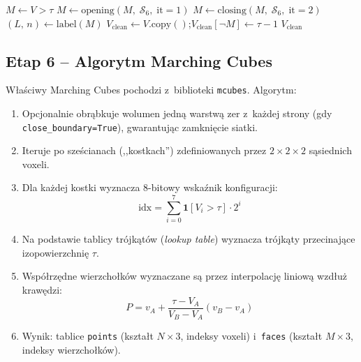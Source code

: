 \documentclass[12pt,a4paper]{article}
\begin{document}
\begin{algorithm}[H]
\caption{\textsc{Segment} -- segmentacja morfologiczna i filtracja składowych}
\label{alg:seg}
\BlankLine
$M \leftarrow V > \tau$\;
$M \leftarrow \mathrm{opening}(M,\;\mathcal{S}_6,\;\text{it}=1)$\;
$M \leftarrow \mathrm{closing}(M,\;\mathcal{S}_6,\;\text{it}=2)$\;
$(L,\,n) \leftarrow \mathrm{label}(M)$
$V_{\text{clean}} \leftarrow V.\mathrm{copy}()$;\quad $V_{\text{clean}}[\lnot M] \leftarrow \tau - 1$\;
\Return $V_{\text{clean}}$\;
\end{algorithm}

\subsection{Etap 6 -- Algorytm Marching Cubes}
\label{sec:mc}

Właściwy Marching Cubes pochodzi z~biblioteki \texttt{mcubes}. Algorytm:
\begin{enumerate}
  \item Opcjonalnie obrąbkuje wolumen jedną warstwą zer z~każdej strony
    (gdy \texttt{close\_boundary=True}), gwarantując zamknięcie siatki.
  \item Iteruje po sześcianach (,,kostkach'') zdefiniowanych przez $2 \times 2 \times 2$
    sąsiednich voxeli.
  \item Dla każdej kostki wyznacza 8-bitowy wskaźnik konfiguracji:
    \[
      \text{idx} = \sum_{i=0}^{7} \mathbf{1}[V_i > \tau] \cdot 2^i
    \]
  \item Na podstawie tablicy trójkątów (\textit{lookup table}) wyznacza
    trójkąty przecinające izopowierzchnię $\tau$.
  \item Współrzędne wierzchołków wyznaczane są przez interpolację liniową
    wzdłuż krawędzi:
    \[
      P = v_A + \frac{\tau - V_A}{V_B - V_A} (v_B - v_A)
    \]
  \item Wynik: tablice \texttt{points} (kształt $N \times 3$, indeksy voxeli)
    i~\texttt{faces} (kształt $M \times 3$, indeksy wierzchołków).
\end{enumerate}
\end{document}
